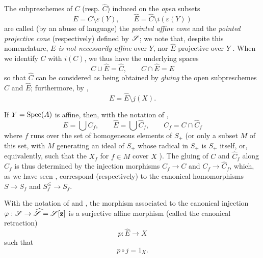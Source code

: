 \begin{env}[8.3.4]
\label{II.8.3.4}
The subpreschemes of $C$ (resp. $\widehat{C}$) induced on the \emph{open} subsets
\[
\label{II.8.3.4.1}
  E = C \setminus \varepsilon(Y),
  \qquad
  \widehat{E} = \widehat{C} \setminus i(\varepsilon(Y))
\tag{8.3.4.1}
\]
are called (by an abuse of language) the \emph{pointed affine cone} and the \emph{pointed projective cone} (respectively) defined by $\mathscr{S}$;
we note that, despite this nomenclature, \emph{$E$ is not necessarily affine} over $Y$, nor $\widehat{E}$ projective over $Y$ .
When we identify $C$ with $i(C)$, we thus have the underlying spaces
\[
\label{II.8.3.4.2}
  C \cup \widehat{E} = \widehat{C},
  \qquad
  C \cap \widehat{E} = E
\tag{8.3.4.2}
\]
so that $\widehat{C}$ can be considered as being obtained by \emph{gluing} the open subpreschemes $C$ and $\widehat{E}$;
furthermore, by ,
\[
\label{II.8.3.4.3}
  E = \widehat{E} \setminus j(X).
\tag{8.3.4.3}
\]

If $Y=\operatorname{Spec}(A)$ is affine, then, with the notation of ,
\[
\label{II.8.3.4.4}
  E = \bigcup C_f,
  \qquad
  \widehat{E} = \bigcup \widehat{C}_f,
  \qquad
  C_f = C \cap \widehat{C}_f
\tag{8.3.4.4}
\]
where $f$ runs over the set of homogeneous elements of $S_+$ (or only a subset $M$ of this set, with $M$ generating an ideal of $S_+$ whose radical in $S_+$ is $S_+$ itself, or, equivalently, such that the $X_f$ for $f\in M$ cover $X$ ).
The gluing of $C$ and $\widehat{C}_f$ along $C_f$ is thus determined by the injection morphisms $C_f\to C$ and $C_f\to\widehat{C}_f$, which, as we have seen , correspond (respectively) to the canonical homomorphisms $S\to S_f$ and $S_f^\leq\to S_f$.
\end{env}

\begin{proposition}[8.3.5]
\label{II.8.3.5}
With the notation of  and , the morphism associated  to the canonical injection $\varphi:\sh{S} \to \widehat{\sh{S}} = \sh{S}[\bb{z}]$ is a surjective affine morphism (called the canonical retraction)
\[
\label{II.8.3.5.1}
  p:\widehat{E} \to X
\tag{8.3.5.1}
\]
such that
\[
\label{II.8.3.5.2}
  p \circ j = 1_X.
\tag{8.3.5.2}
\]
\end{proposition}

